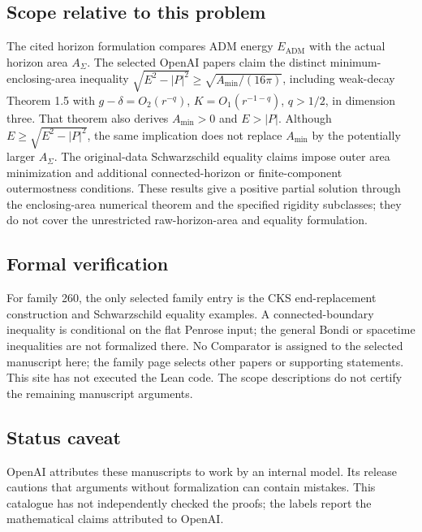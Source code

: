 \documentclass[11pt]{article}
\begin{document}
\subsection{Scope relative to this problem}
The cited horizon formulation compares ADM energy $E_{\mathrm{ADM}}$ with the actual horizon area $A_\Sigma$. The selected OpenAI papers claim the distinct minimum-enclosing-area inequality $\sqrt{E^2-|P|^2}\ge\sqrt{A_{\min}/(16\pi)}$, including weak-decay Theorem 1.5 with $g-\delta=O_2(r^{-q})$, $K=O_1(r^{-1-q})$, $q>1/2$, in dimension three. That theorem also derives $A_{\min}>0$ and $E>|P|$. Although $E\ge\sqrt{E^2-|P|^2}$, the same implication does not replace $A_{\min}$ by the potentially larger $A_\Sigma$. The original-data Schwarzschild equality claims impose outer area minimization and additional connected-horizon or finite-component outermostness conditions. These results give a positive partial solution through the enclosing-area numerical theorem and the specified rigidity subclasses; they do not cover the unrestricted raw-horizon-area and equality formulation.

\subsection{Formal verification}
For family 260, the only selected family entry is the CKS end-replacement construction and Schwarzschild equality examples. A connected-boundary inequality is conditional on the flat Penrose input; the general Bondi or spacetime inequalities are not formalized there. No Comparator is assigned to the selected manuscript here; the family page selects other papers or supporting statements. This site has not executed the Lean code. The scope descriptions do not certify the remaining manuscript arguments.

\subsection{Status caveat}
OpenAI attributes these manuscripts to work by an internal model. Its release cautions that arguments without formalization can contain mistakes. This catalogue has not independently checked the proofs; the labels report the mathematical claims attributed to OpenAI.
\end{document}
